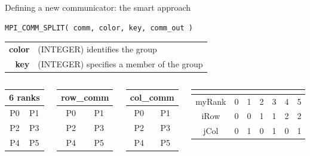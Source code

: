\documentclass[aspectratio=43]{beamer}
\begin{document}
\begin{frame}[fragile]{Defining a new communicator: the smart approach}
\footnotesize
\begin{verbatim}
MPI_COMM_SPLIT( comm, color, key, comm_out )
\end{verbatim}
\vspace{-0.2cm}
\begin{black1block}{}
\begin{tabular}{rp{8cm}}
\textbf{color} & (INTEGER) identifies the group\\
\textbf{key} & (INTEGER) specifies a member of the group\\
\end{tabular}
\end{black1block}
\begin{columns}
\begin{column}{0.2\paperwidth}
\begin{tabular}{|c|c|}
    \multicolumn{2}{c}{6 ranks} \\\hline
    P0 & P1 \\\hline
    P2 & P3 \\\hline
    P4 & P5 \\\hline
\end{tabular}
\end{column}
\begin{column}{0.2\paperwidth}
\begin{tabular}{|c|c|}
    \multicolumn{2}{c}{row\_comm} \\\hline
    \color{cscsred}P0 & \color{cscsred}P1 \\\hline
    \color{cscsgreen}P2 & \color{cscsgreen}P3 \\\hline
    \color{cscsblue}P4 & \color{cscsblue}P5 \\\hline
\end{tabular}
\end{column}
\begin{column}{0.2\paperwidth}
\begin{tabular}{|c|c|}
    \multicolumn{2}{c}{col\_comm} \\\hline
    \color{cscsred}P0 & \color{cscsblue}P1 \\\hline
    \color{cscsred}P2 & \color{cscsblue}P3 \\\hline
    \color{cscsred}P4 & \color{cscsblue}P5 \\\hline
\end{tabular}
\end{column}
\begin{column}{0.4\paperwidth}
\begin{tabular}{|c|c|c|c|c|c|c|}
    \multicolumn{7}{c}{} \\\hline
myRank & 0 & 1 & 2 & 3 & 4 & 5 \\\hline
iRow & 0 & 0 & 1 & 1 & 2 & 2 \\\hline
jCol & 0 & 1 & 0 & 1 & 0 & 1 \\\hline
\end{tabular}
\end{column}


\end{columns}
\end{frame}
\end{document}

